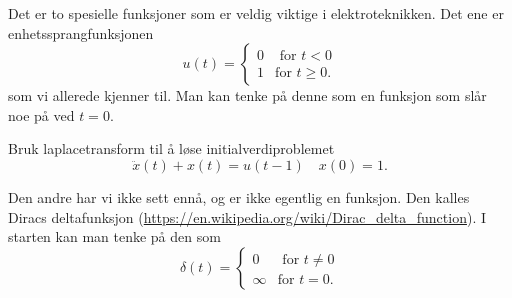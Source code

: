 \documentclass[a4paper,norsk,11pt]{interaktiv}
\begin{document}
Det er to spesielle funksjoner som er veldig viktige i elektroteknikken. 
Det ene er enhetssprangfunksjonen
\[
u(t)= \left\{ 
\begin{array}{ll}
0 & \mbox{ for } t<0\\
1 & \mbox{for } t\geq 0.
\end{array}
\right.
\]
som vi allerede kjenner til.
Man kan tenke på denne som en funksjon som slår noe på ved $t=0$. 
 \begin{center}
  \end{center}


\begin{oppgave}{6}
Bruk laplacetransform til å løse initialverdiproblemet
\[
\ddot{x}(t)+x(t)=u(t-1) \quad x(0)=1.
\]
\end{oppgave}

Den andre har vi ikke sett ennå, 
og er ikke egentlig en funksjon. 
Den kalles Diracs deltafunksjon (\url{https://en.wikipedia.org/wiki/Dirac_delta_function}).
I starten kan man tenke på den som 
\[
\delta(t)= \left\{ 
\begin{array}{ll}
0 & \mbox{ for } t\neq 0\\
\infty & \mbox{for } t= 0.
\end{array}
\right.
\]
\end{document}
